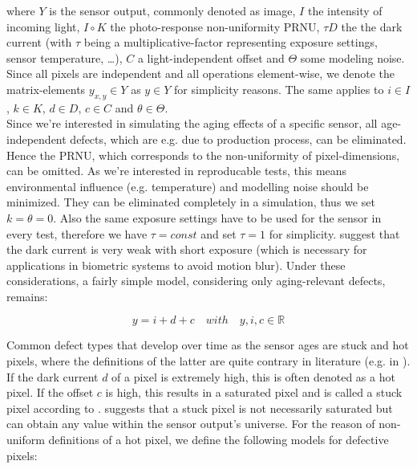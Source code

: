 \documentclass[10pt,twocolumn,letterpaper]{article}
\begin{document}
where $Y$ is the sensor output, commonly denoted as image, $I$ the intensity of incoming light, $I \circ K$ the photo-response non-uniformity PRNU, $\tau D$ the the dark current (with $\tau$ being a multiplicative-factor representing exposure settings, sensor temperature, \dots), $C$ a light-independent offset and $\Theta$ some modeling noise. Since all pixels are independent \cite{fridrich} \cite{defectDetection} and all operations element-wise, we denote the matrix-elements $y_{x,y} \in Y$ as $ y \in Y$ for simplicity reasons. The same applies to $i \in I$, $k \in K$, $d \in D$, $c \in C$ and $\theta \in \Theta$.\\
Since we're interested in simulating the aging effects of a specific sensor, all age-independent defects, which are e.g. due to production process, can be eliminated. Hence the PRNU, which corresponds to the non-uniformity of pixel-dimensions, can be omitted. As we're interested in reproducable tests, this means environmental influence (e.g. temperature) and modelling noise should be minimized. They can be eliminated completely in a simulation, thus we set $k=\theta=0$. Also the same exposure settings have to be used for the sensor in every test, therefore we have $\tau = const$ and set $ \tau = 1$ for simplicity. \cite{camAndDisplays}\cite{radiometricCCD}\cite{failureSemi}\cite{fridrich} suggest that the dark current is very weak with short exposure (which is necessary for applications in biometric systems to avoid motion blur). Under these considerations, a fairly simple model, considering only aging-relevant defects, remains:

\begin{equation}
  \label{equ:pixemodelEasier}
  y = i + d + c \quad with \quad y,i,c \in \mathbb{R}
\end{equation}

Common defect types that develop over time as the sensor ages are stuck and hot pixels, where the definitions of the latter are quite contrary in literature (e.g. in \cite{fridrich, defectIdentification, failureSemi}). If the dark current $d$ of a pixel is extremely high, this is often denoted as a hot pixel. If the offset $c$ is high, this results in a saturated pixel and is called a stuck pixel according to \cite{fridrich}. \cite{defectIdentification} suggests that a stuck pixel is not necessarily saturated but can obtain any value within the sensor output's universe. For the reason of non-uniform definitions of a hot pixel, we define the following models for defective pixels:
\end{document}

